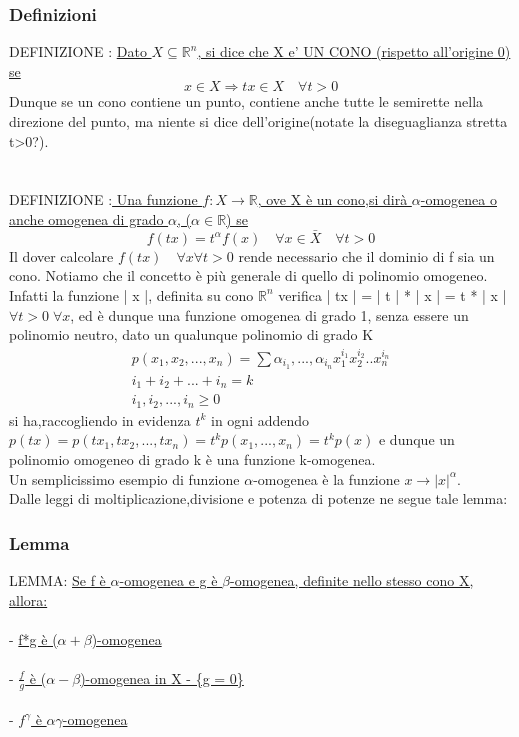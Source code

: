 \documentclass[fontsize = 20px, paper = a4]{article}
\begin{document}
\subsubsection{Definizioni}
DEFINIZIONE :  \underline{Dato $X\subseteq \mathbb{R}^n$, si dice che X e' \underline{ UN CONO} (rispetto all'origine 0) se}
$$x\in X \Rightarrow tx \in X \quad \forall t > 0$$
Dunque se un cono contiene un punto, contiene anche tutte le semirette nella direzione del punto, ma niente si dice dell'origine(notate la diseguaglianza stretta t>0?).\\ \\\\
DEFINIZIONE :\underline{ Una funzione $f:X\rightarrow\mathbb{R}$, ove X è un cono,}\underline{si dirà $\alpha$-omogenea o }\\ 
\underline{anche omogenea di grado $\alpha$, ($\alpha \in \mathbb{R}$) se}
$$f(tx) = t^\alpha f(x) \quad \forall x \in \bar{X} \quad \forall t>0 $$
Il dover calcolare $f(tx)\quad \forall x \forall t >0 $ rende necessario che il dominio di f sia un cono. Notiamo che il concetto è più generale di quello di polinomio omogeneo. Infatti la funzione | x |, definita su cono $\mathbb{R}^n$
 verifica | tx | = | t | * | x | = t * | x | $\forall t > 0 \; \forall x$, ed è dunque una funzione omogenea di grado 1, senza essere un polinomio neutro, dato un qualunque polinomio di grado K
 $$\begin{array}{lcl}p(x_1,x_2,...,x_n) =  \sum{\alpha_{i_1},...,\alpha_{i_n} x_1^{i_1} x_2^{i_2}.. x_n^{i_n}}\\ i_1 + i_2 +...+i_n = k \\ i_1,i_2,...,i_n \ge 0 \end{array}$$ 
si ha,raccogliendo in evidenza $t^k$ in ogni addendo $p(tx) = p(tx_1,tx_2,...,tx_n) = t^kp(x_1,...,x_n) = t^kp(x)$
e dunque un polinomio omogeneo di grado k è una funzione k-omogenea.\\
Un semplicissimo esempio di funzione $\alpha$-omogenea è la funzione $x\rightarrow|x|^\alpha$.\\
Dalle leggi di moltiplicazione,divisione e potenza di potenze ne segue tale lemma:\\
\subsubsection{Lemma}
LEMMA: \underline{Se f è $\alpha$-omogenea e g è $\beta$-omogenea, definite nello stesso cono X, allora:}\\\\
\hspace*{1.5cm}- \underline{f*g è ($\alpha + \beta$)-omogenea}\\\\
\hspace*{1.5cm}- \underline{$\frac{f}{g}$ è ($\alpha - \beta$)-omogenea in X - \{g = 0\}}\\\\
\hspace*{1.5cm}- \underline{$f^{\gamma }$ è $\alpha \gamma $-omogenea}\\
\end{document}
